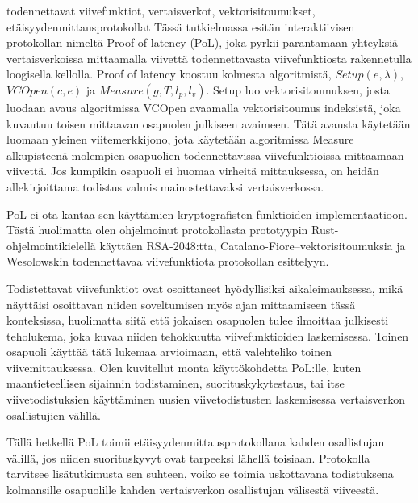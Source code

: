\begin{ittiivis}{todennettavat viivefunktiot, vertaisverkot, vektorisitoumukset, etäisyydenmittausprotokollat}
	Tässä tutkielmassa esitän interaktiivisen protokollan nimeltä Proof of latency (PoL), joka pyrkii parantamaan yhteyksiä vertaisverkoissa mittaamalla viivettä todennettavasta viivefunktiosta rakennetulla loogisella kellolla. Proof of latency koostuu kolmesta algoritmistä, \(Setup(e, \lambda)\), \(VCOpen(c, e)\) ja \(Measure(g, T, l_p, l_v)\). Setup luo vektorisitoumuksen, josta luodaan avaus algoritmissa VCOpen avaamalla vektorisitoumus indeksistä, joka kuvautuu toisen mittaavan osapuolen julkiseen avaimeen. Tätä avausta käytetään luomaan yleinen viitemerkkijono, jota käytetään algoritmissa Measure alkupisteenä molempien osapuolien todennettavissa viivefunktioissa mittaamaan viivettä. Jos kumpikin osapuoli ei huomaa virheitä mittauksessa, on heidän allekirjoittama todistus valmis mainostettavaksi vertaisverkossa.

PoL ei ota kantaa sen käyttämien kryptografisten funktioiden implementaatioon. Tästä huolimatta olen ohjelmoinut protokollasta prototyypin Rust-ohjelmointikielellä käyttäen RSA-2048:tta, Catalano-Fiore--vektorisitoumuksia ja Wesolowskin todennettavaa viivefunktiota protokollan esittelyyn. 

Todistettavat viivefunktiot ovat osoittaneet hyödyllisiksi aikaleimauksessa, mikä näyttäisi osoittavan niiden soveltumisen myös ajan mittaamiseen tässä konteksissa, huolimatta siitä että jokaisen osapuolen tulee ilmoittaa julkisesti teholukema, joka kuvaa niiden tehokkuutta viivefunktioiden laskemisessa. Toinen osapuoli käyttää tätä lukemaa arvioimaan, että valehteliko toinen viivemittauksessa. Olen kuvitellut monta käyttökohdetta PoL:lle, kuten maantieteellisen sijainnin todistaminen, suorituskykytestaus, tai itse viivetodistuksien käyttäminen uusien viivetodistusten laskemisessa vertaisverkon osallistujien välillä.

Tällä hetkellä PoL toimii etäisyydenmittausprotokollana kahden osallistujan välillä, jos niiden suorituskyvyt ovat tarpeeksi lähellä toisiaan. Protokolla tarvitsee lisätutkimusta sen suhteen, voiko se toimia uskottavana todistuksena kolmansille osapuolille kahden vertaisverkon osallistujan välisestä viiveestä.
\end{ittiivis}
